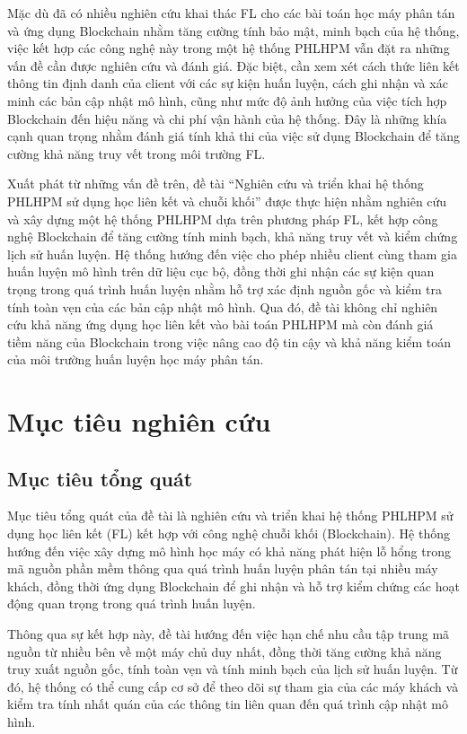 Mặc dù đã có nhiều nghiên cứu khai thác \ac{FL} cho các bài toán học máy phân tán và ứng dụng
Blockchain nhằm tăng cường tính bảo mật, minh bạch của hệ thống, việc kết hợp các công nghệ này
trong một hệ thống \ac{PHLHPM} vẫn đặt ra những vấn đề cần được nghiên cứu và đánh giá. Đặc biệt,
cần xem xét cách thức liên kết thông tin định danh của client với các sự kiện huấn luyện, cách ghi
nhận và xác minh các bản cập nhật mô hình, cũng như mức độ ảnh hưởng của việc tích hợp Blockchain
đến hiệu năng và chi phí vận hành của hệ thống. Đây là những khía cạnh quan trọng nhằm đánh giá
tính khả thi của việc sử dụng Blockchain để tăng cường khả năng truy vết trong môi trường \ac{FL}.

Xuất phát từ những vấn đề trên, đề tài “Nghiên cứu và triển khai hệ thống \ac{PHLHPM} sử dụng học
liên kết và chuỗi khối” được thực hiện nhằm nghiên cứu và xây dựng một hệ thống \ac{PHLHPM} dựa
trên phương pháp \ac{FL}, kết hợp công nghệ Blockchain để tăng cường tính minh bạch, khả năng truy
vết và kiểm chứng lịch sử huấn luyện. Hệ thống hướng đến việc cho phép nhiều client cùng tham gia
huấn luyện mô hình trên dữ liệu cục bộ, đồng thời ghi nhận các sự kiện quan trọng trong quá trình
huấn luyện nhằm hỗ trợ xác định nguồn gốc và kiểm tra tính toàn vẹn của các bản cập nhật mô hình.
Qua đó, đề tài không chỉ nghiên cứu khả năng ứng dụng học liên kết vào bài toán \ac{PHLHPM} mà còn
đánh giá tiềm năng của Blockchain trong việc nâng cao độ tin cậy và khả năng kiểm toán của môi
trường huấn luyện học máy phân tán.

\section{Mục tiêu nghiên cứu}

\subsection{Mục tiêu tổng quát}

Mục tiêu tổng quát của đề tài là nghiên cứu và triển khai hệ thống \ac{PHLHPM} sử dụng học liên kết
(\ac{FL}) kết hợp với công nghệ chuỗi khối (Blockchain). Hệ thống hướng đến việc xây dựng mô hình
học máy có khả năng phát hiện lỗ hổng trong mã nguồn phần mềm thông qua quá trình huấn luyện phân
tán tại nhiều máy khách, đồng thời ứng dụng Blockchain để ghi nhận và hỗ trợ kiểm chứng các hoạt
động quan trọng trong quá trình huấn luyện.

Thông qua sự kết hợp này, đề tài hướng đến việc hạn chế nhu cầu tập trung mã nguồn từ nhiều bên về
một máy chủ duy nhất, đồng thời tăng cường khả năng truy xuất nguồn gốc, tính toàn vẹn và tính minh
bạch của lịch sử huấn luyện. Từ đó, hệ thống có thể cung cấp cơ sở để theo dõi sự tham gia của các
máy khách và kiểm tra tính nhất quán của các thông tin liên quan đến quá trình cập nhật mô hình.


